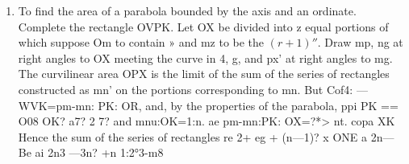 \begin{enumerate}
%
%
%
%
%
%
%
%
%
%
%
%
%
%
%
%
%
%
%
%
%
%
%
%
%
%
%
%
%
%


\item To find the area of a parabola bounded by the axis and an ordinate.
    Complete the rectangle OVPK. Let OX be divided into z equal portions of
    which suppose Om to contain » and mz to be the $(r+ 1)''$. Draw mp, ng at
    right angles to OX meeting the curve in 4, g, and px’ at right angles to mg.
    The curvilinear area OPX is the limit of the sum of the series of rectangles
    constructed as mn’ on the portions corresponding to mn.  But Cof4:
    —WVK=pm-mn: PK: OR, and, by the properties of the parabola, ppi PK == O08
    OK?  a7? 2 7?  and mnu:OK=1:n.  ae pm-mn:PK: OX=?*> nt.  copa XK Hence the
    sum of the series of rectangles re 2+ eg + (n—1)? x ONE a 2n— Be ai 2n3 —3n?
    +n 1:2°3-m8

%
%
%



\end{enumerate}
